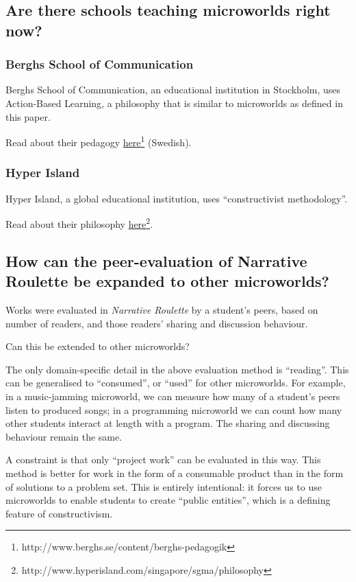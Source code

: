 \subsection{Are there schools teaching microworlds right now?}

\subsubsection{Berghs School of Communication}

Berghs School of Communication, an educational institution in Stockholm, uses Action-Based Learning, a philosophy that is similar to microworlds as defined in this paper.

Read about their pedagogy \href{http://www.berghs.se/content/berghs-pedagogik}{here}\footnote{http://www.berghs.se/content/berghs-pedagogik} (Swedish). 

\subsubsection{Hyper Island}

Hyper Island, a global educational institution, uses ``constructivist methodology''.

Read about their philosophy \href{http://www.hyperisland.com/singapore/sgma/philosophy}{here}\footnote{http://www.hyperisland.com/singapore/sgma/philosophy}.

\subsection{How can the peer-evaluation of Narrative Roulette be
expanded to other microworlds?}

Works were evaluated in \emph{Narrative Roulette} by a student's peers,
based on number of readers, and those readers' sharing and discussion
behaviour.

Can this be extended to other microworlds?

The only domain-specific detail in the above evaluation method is
``reading''. This can be generalised to ``consumed'', or ``used'' for
other microworlds. For example, in a music-jamming microworld, we can
measure how many of a student's peers listen to produced songs; in a
programming microworld we can count how many other students interact at
length with a program. The sharing and discussing behaviour remain the
same.

A constraint is that only ``project work'' can be evaluated in this way.
This method is better for work in the form of a consumable product than in the form of solutions to
a problem set. This is entirely intentional: it forces us to
use microworlds to enable students to create ``public entities'', which
is a defining feature of constructivism.

